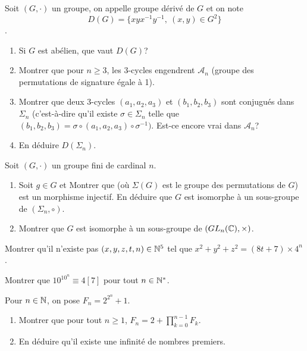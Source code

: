 \begin{exercise}
	Soit $(G,\cdot)$ un groupe, on appelle groupe dérivé de $G$ et on note
	$$D(G)=\{xyx^{-1}y^{-1},~(x,y)\in G^{2}\}$$.
	\begin{enumerate}
		\item
		Si $G$ est abélien, que vaut $D(G)$?
		\item
		Montrer que pour $n\geqslant3$, les 3-cycles engendrent $\mathcal{A}_{n}$
		(groupe des permutations de signature égale à 1).
		\item
		Montrer que deux 3-cycles $(a_{1},a_{2},a_{3})$ et $(b_{1},b_{2},b_{3})$
		sont conjugués dans $\Sigma_{n}$ (c'est-à-dire qu'il existe
		$\sigma\in\Sigma_{n}$ telle que
		$(b_{1},b_{2},b_{3})=\sigma\circ(a_{1},a_{2},a_{3})\circ\sigma^{-1})$.
		Est-ce encore vrai dans $\mathcal{A}_{n}$?
		\item
		En déduire $D(\Sigma_{n})$.
	\end{enumerate}
\end{exercise}

\begin{exercise}
	Soit $(G,\cdot)$ un groupe fini de cardinal $n$.
	\begin{enumerate}
		\item
		Soit $g\in G$ et  Montrer que
		(où $\Sigma(G)$ est le groupe des permutations de $G$) est un morphisme
		injectif. En déduire que $G$ est isomorphe à un sous-groupe de
		$(\Sigma_{n},\circ)$.
		\item
		Montrer que $G$ est isomorphe à un sous-groupe de $(GL_{n}(\mathbb{C}),\times)$.
	\end{enumerate}
\end{exercise}

\begin{exercise}
	Montrer qu'il n'existe pas $(x,y,z,t,n)\in \mathbb{N}^{5}$ tel que
	$x^{2}+y^{2}+z^{2}=(8t+7)\times 4^{n}$.
\end{exercise}

\begin{exercise}
	Montrer que $10^{10^{n}}\equiv 4 [7]$ pour tout $n\in\mathbb{N}^{*}$.
\end{exercise}

\begin{exercise}
	Pour $n\in\mathbb{N}$, on pose $F_{n}=2^{2^{n}}+1$.
	\begin{enumerate}
		\item
		Montrer que pour tout $n\geqslant1$, $F_{n}=2+\prod_{k=0}^{n-1}F_{k}$.
		\item
		En déduire qu'il existe une infinité de nombres premiers.
	\end{enumerate}
\end{exercise}

